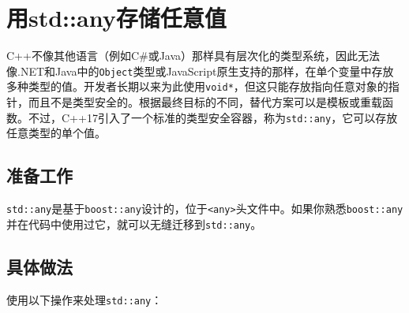 
\section{用std::any存储任意值}



C++不像其他语言（例如C\#或Java）那样具有层次化的类型系统，因此无法像.NET和Java中的\texttt{Object}类型或JavaScript原生支持的那样，在单个变量中存放多种类型的值。开发者长期以来为此使用\texttt{void*}，但这只能存放指向任意对象的指针，而且不是类型安全的。根据最终目标的不同，替代方案可以是模板或重载函数。不过，C++17引入了一个标准的类型安全容器，称为\texttt{std::\allowbreak{}any}，它可以存放任意类型的单个值。



\subsection{准备工作}



\texttt{std::\allowbreak{}any}是基于\texttt{boost::\allowbreak{}any}设计的，位于\texttt{<\allowbreak{}any>}头文件中。如果你熟悉\texttt{boost::\allowbreak{}any}并在代码中使用过它，就可以无缝迁移到\texttt{std::\allowbreak{}any}。



\subsection{具体做法}



使用以下操作来处理\texttt{std::\allowbreak{}any}：



